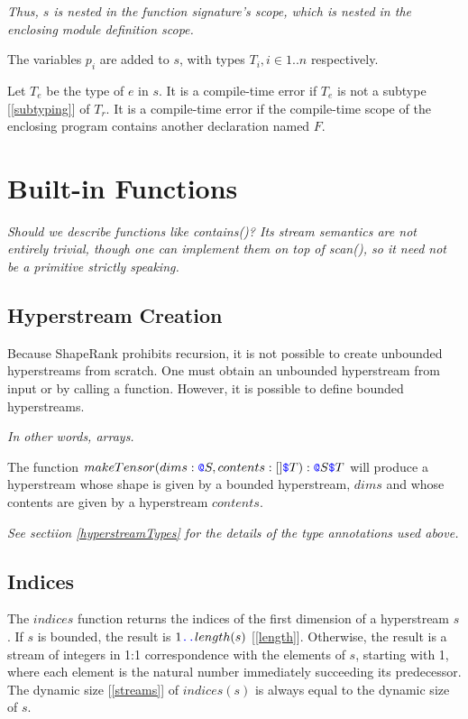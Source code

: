 \documentclass{article}
\begin{document}
{\em Thus, $s$ is nested in the function signature's scope, which is nested in the enclosing module definition scope.}

The variables $p_i$ are added to $s$, with types $T_i, i \in 1..n$ respectively.

Let $T_e$ be the type of $e$ in $s$. 
It is a compile-time error if  $T_e$ is not a subtype [\ref{subtyping}] of $T_r$.  It is a compile-time error if the compile-time scope of the enclosing program contains another declaration named $F$.

\section{Built-in Functions}
\label{builtinFunctions}

{\em
Should we describe functions like contains()? Its stream semantics are not entirely trivial, though one can implement them on top of scan(), so it need not be a primitive strictly speaking.
}

\subsection{Hyperstream Creation}
\label{streamCreation}

Because ShapeRank prohibits recursion, it is not possible to create unbounded hyperstreams from scratch. One must obtain an unbounded hyperstream from input or by calling a function.
However, it is possible to define bounded hyperstreams.

{\em In other words, arrays.}

The function $makeTensor(dims: \texttt{\color{blue} @}{}S, contents: []\texttt{\color{blue} \$}{}T):\texttt{\color{blue} @}{}S \texttt{\color{blue} \$}{}T$
will produce a hyperstream whose shape is given by a bounded hyperstream, $dims$ and whose contents are given by a hyperstream $contents$.

{\em
See sectiion \ref{hyperstreamTypes} for the details of the type annotations used above.
}

\subsection{Indices}
\label{indices}

The $indices$ function returns the indices of the first dimension of a hyperstream $s$. If $s$ is bounded, the result is $1 \texttt{\color{blue} ..}{} length(s)$ [\ref{length}].  Otherwise, the result is a stream of integers in 1:1 correspondence with the elements of $s$, starting with 1, where each element is the natural number immediately succeeding its predecessor. The dynamic size [\ref{streams}] of $indices(s)$ is always equal to the dynamic size of $s$.
\end{document}
